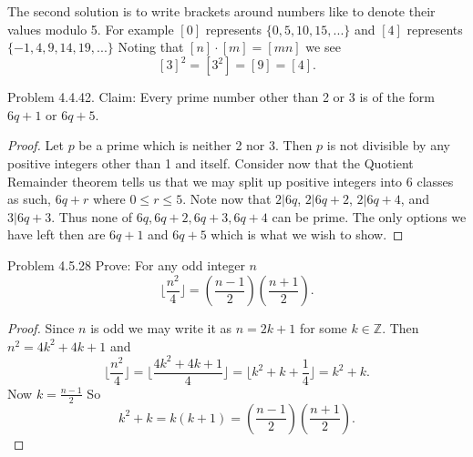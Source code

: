 \documentclass[10 pt]{amsart}
\theoremstyle{definition}
\theoremstyle{remark}
\numberwithin{equation}{subsection}
\begin{document}
The second solution is to write brackets around numbers like to denote their values modulo 5.
For example $[0]$ represents $\{0,5,10,15,...\}$ and $[4]$ represents $\{-1,4,9,14,19,...\}$
Noting that $[n]\cdot[m] = [mn]$ we see
\[
[3]^2 = [3^2] = [9] = [4].
\]



\newpage
Problem 4.4.42. Claim: Every prime number other than 2 or 3 is of the form $6q+1$ or $6q+5$.
\begin{proof}
Let $p$ be a prime which is neither 2 nor 3.  Then $p$ is not divisible by any positive integers other than 1 and itself.  Consider now that the Quotient Remainder theorem tells us that we may split up positive integers into 6 classes as such, $6q+r$ where $0\leq r \leq 5$.  Note now that $2|6q$, $2|6q+2$, $2|6q+4$, and $3|6q+3$.  Thus none of $6q,6q+2,6q+3,6q+4$ can be prime.  The only options we have left then are $6q+1$ and $6q+5$ which is what we wish to show.
\end{proof}



\newpage
Problem 4.5.28 Prove: For any odd integer $n$ 
\[
\lfloor \frac{n^2}{4} \rfloor = \left(\frac{n-1}{2}\right) \left(\frac{n+1}{2}\right).
\]

\begin{proof}
Since $n$ is odd we may write it as $n=2k+1$ for some $k\in\mathbb{Z}$.  Then $n^2 = 4k^2+4k+1$ and 
\[
\lfloor \frac{n^2}{4} \rfloor = \lfloor \frac{4k^2+4k+1}{4} \rfloor = \lfloor k^2+k+\frac{1}{4}\rfloor = k^2+k.
\]
Now $k=\frac{n-1}{2}$ So
\[
k^2+k = k(k+1) = \left(\frac{n-1}{2}\right)\left(\frac{n+1}{2}\right).
\]

\end{proof}
\end{document}
